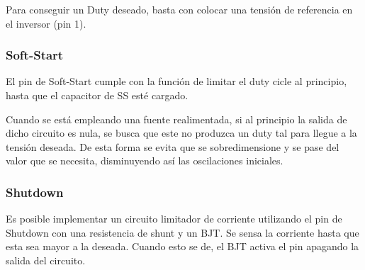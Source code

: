 Para conseguir un Duty deseado, basta con colocar una tensión de referencia en el inversor (pin 1).

\subsubsection{Soft-Start}

El pin de Soft-Start cumple con la función de limitar el duty cicle al principio, hasta que el capacitor de SS esté cargado. %

Cuando se está empleando una fuente realimentada, si al principio la salida de dicho circuito es nula, se busca que este no produzca un duty tal para llegue a la tensión deseada. De esta forma se evita que se sobredimensione y se pase del valor que se necesita, disminuyendo así las oscilaciones iniciales.


\subsubsection{Shutdown}

Es posible implementar un circuito limitador de corriente utilizando el pin de Shutdown con una resistencia de shunt y un BJT. Se sensa la corriente hasta que esta sea mayor a la deseada. Cuando esto se de, el BJT activa el pin apagando la salida del circuito.

%